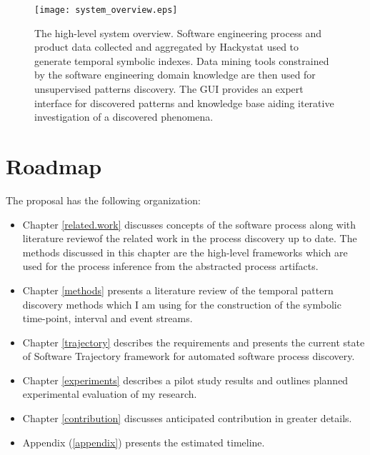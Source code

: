 \begin{figure}[tbp]
   \centering
   \texttt{[image: system\_overview.eps]}
   \caption{The high-level system overview. Software engineering process and product data collected and aggregated by Hackystat used to generate temporal symbolic indexes. Data mining tools constrained by the software engineering domain knowledge are then used for unsupervised patterns discovery. The GUI provides an expert interface for discovered patterns and knowledge base aiding iterative investigation of a discovered phenomena.}
   \label{fig:system_overview}
\end{figure}

\section{Roadmap}
The proposal has the following organization:
\begin{itemize}
	\item Chapter \ref{related.work} discusses concepts of the software process along with literature reviewof the related work in the process discovery up to date. The methods discussed in this chapter are the high-level frameworks which are used for the process inference from the abstracted process artifacts.
	\item Chapter \ref{methods} presents a literature review of the temporal pattern discovery methods which I am using for the construction of the symbolic time-point, interval and event streams.
	\item Chapter \ref{trajectory} describes the requirements and presents the current state of Software Trajectory framework for automated software process discovery.
	\item Chapter \ref{experiments} describes a pilot study results and outlines planned experimental evaluation of my research.
	\item Chapter \ref{contribution} discusses anticipated contribution in greater details.
	\item Appendix (\ref{appendix}) presents the estimated timeline.
\end{itemize}
